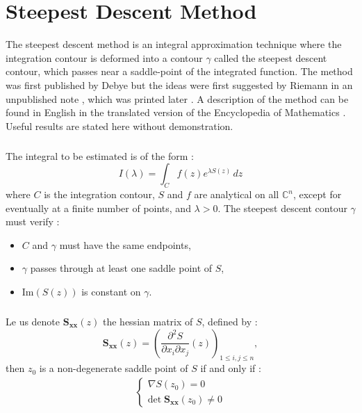 \chapter{Steepest Descent Method}
\label{PhaseStationnaire}
The steepest descent method is an integral approximation technique where the integration contour is deformed into a contour $\gamma$ called the steepest descent contour, which passes near a saddle-point of the integrated function. The method was first published by Debye \cite{Debye} but the ideas were first suggested by Riemann in an unpublished note \cite{RiemannUnpub}, which was printed later \cite{Riemann}. A description of the method can be found in English in the translated version of the Encyclopedia of Mathematics \cite{Encycl}. Useful results are stated here without demonstration.

\paragraph{}
The integral to be estimated is of the form :
\begin{equation}
I(\lambda)=\int_C f(z)e^{\lambda S(z)}\,dz
\end{equation}
where $C$ is the integration contour, $S$ and $f$ are analytical on all $\mathbb{C}^n$, except for eventually at a finite number of points, and $\lambda>0$. The steepest descent contour $\gamma$ must verify :
\begin{itemize}
\item $C$ and $\gamma$ must have the same endpoints,
\item $\gamma$ passes through at least one saddle point of $S$,
\item Im$(S(z))$ is constant on $\gamma$.
\end{itemize}

\paragraph{}
Le us denote $\mathbf{S_{xx}}(z)$ the hessian matrix of $S$, defined by :
\begin{equation}
\mathbf{S_{xx}}(z)=\left( \frac{\partial^2 S}{\partial x_i \partial x_j}(z) \right)_{1\leq i,j \leq n},
\end{equation}
then $z_ 0$ is a non-degenerate saddle point of $S$ if and only if :
\begin{eqnarray}
\left\{
\begin{array}{l}
\nabla S(z_0)=0 \\
\mbox{det} \; \mathbf{S_{xx}}(z_0) \neq 0
\end{array}
\right.
\end{eqnarray}

